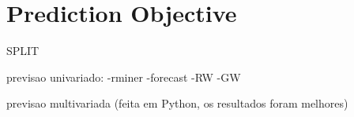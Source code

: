 \newpage

\section{Prediction Objective}

SPLIT 

previsao univariado:
    -rminer
    -forecast
    -RW
    -GW

previsao multivariada (feita em Python, os resultados foram melhores)

